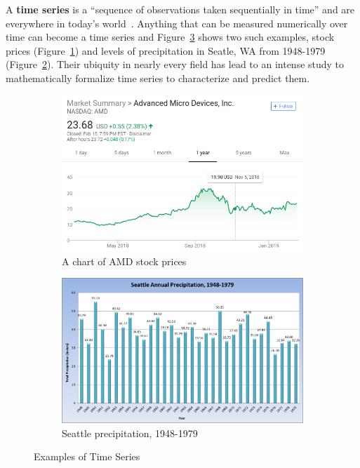 \documentclass[oneside,12pt,openany]{book}
\begin{document}
	A \textbf{time series} is a ``sequence of observations taken sequentially in time'' and are everywhere in today's world~\cite{Box}. Anything that can be measured numerically over time can become a time series and Figure~\ref{fig:TimeSeriesExamples} shows two such examples, stock prices (Figure~\ref{fig:AMDChart}) and levels of precipitation in Seatle, WA from 1948-1979 (Figure~\ref{fig:SeattlePrecip}). Their ubiquity in nearly every field has lead to an intense study to mathematically formalize time series to characterize and predict them.
	
	\begin{figure}[h!]
		\centering
		\begin{subfigure}[b]{.45\textwidth}
			\includegraphics[width=\textwidth]{images/AMDChart.png}
			\caption{A chart of AMD stock prices}
			\label{fig:AMDChart}
		\end{subfigure}
		\begin{subfigure}[b]{.45\textwidth}
			\includegraphics[width=\textwidth]{images/SeattleRainfall.png}
			\caption{Seattle precipitation, 1948-1979}
			\label{fig:SeattlePrecip}
		\end{subfigure}
		\caption[Examples of Time Series]{Examples of Time Series \footnotemark}
		\label{fig:TimeSeriesExamples}
			
	\end{figure}
\end{document}

